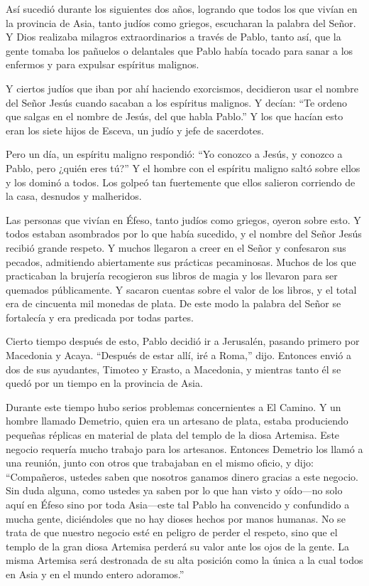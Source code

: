  Así sucedió durante los siguientes dos años, logrando que
todos los que vivían en la provincia de Asia, tanto judíos como griegos,
escucharan la palabra del Señor.  Y Dios realizaba milagros
extraordinarios a través de Pablo,  tanto así, que la gente
tomaba los pañuelos o delantales que Pablo había tocado para sanar a los
enfermos y para expulsar espíritus malignos.

 Y ciertos judíos que iban por ahí haciendo exorcismos,
decidieron usar el nombre del Señor Jesús cuando sacaban a los espíritus
malignos. Y decían: ``Te ordeno que salgas en el nombre de Jesús, del
que habla Pablo.''  Y los que hacían esto eran los siete
hijos de Esceva, un judío y jefe de sacerdotes.

 Pero un día, un espíritu maligno respondió: ``Yo conozco a
Jesús, y conozco a Pablo, pero ¿quién eres tú?''  Y el
hombre con el espíritu maligno saltó sobre ellos y los dominó a todos.
Los golpeó tan fuertemente que ellos salieron corriendo de la casa,
desnudos y malheridos.

 Las personas que vivían en Éfeso, tanto judíos como
griegos, oyeron sobre esto. Y todos estaban asombrados por lo que había
sucedido, y el nombre del Señor Jesús recibió grande respeto.
 Y muchos llegaron a creer en el Señor y confesaron sus
pecados, admitiendo abiertamente sus prácticas pecaminosas.
 Muchos de los que practicaban la brujería recogieron sus
libros de magia y los llevaron para ser quemados públicamente. Y sacaron
cuentas sobre el valor de los libros, y el total era de cincuenta mil
monedas de plata.  De este modo la palabra del Señor se
fortalecía y era predicada por todas partes.

 Cierto tiempo después de esto, Pablo decidió ir a
Jerusalén, pasando primero por Macedonia y Acaya. ``Después de estar
allí, iré a Roma,'' dijo.  Entonces envió a dos de sus
ayudantes, Timoteo y Erasto, a Macedonia, y mientras tanto él se quedó
por un tiempo en la provincia de Asia.

 Durante este tiempo hubo serios problemas concernientes a
El Camino.  Y un hombre llamado Demetrio, quien era un
artesano de plata, estaba produciendo pequeñas réplicas en material de
plata del templo de la diosa Artemisa. Este negocio requería mucho
trabajo para los artesanos.  Entonces Demetrio los llamó a
una reunión, junto con otros que trabajaban en el mismo oficio, y dijo:
``Compañeros, ustedes saben que nosotros ganamos dinero gracias a este
negocio.  Sin duda alguna, como ustedes ya saben por lo que
han visto y oído---no solo aquí en Éfeso sino por toda Asia---este tal
Pablo ha convencido y confundido a mucha gente, diciéndoles que no hay
dioses hechos por manos humanas.  No se trata de que
nuestro negocio esté en peligro de perder el respeto, sino que el templo
de la gran diosa Artemisa perderá su valor ante los ojos de la gente. La
misma Artemisa será destronada de su alta posición como la única a la
cual todos en Asia y en el mundo entero adoramos.''

